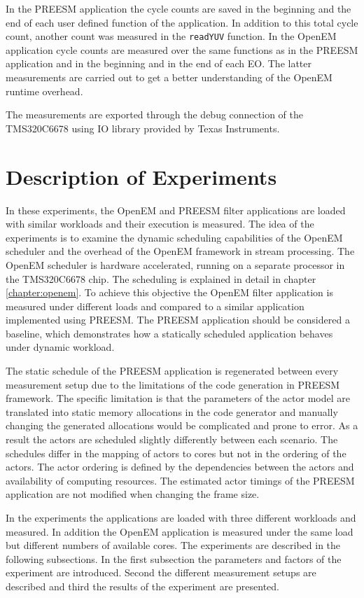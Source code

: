 In the PREESM application the cycle counts are saved in the beginning and the end of each user defined function of the application. In addition to this total cycle count, another count was measured in the \texttt{readYUV} function. In the OpenEM application cycle counts are measured over the same functions as in the PREESM application and in the beginning and in the end of each EO. The latter measurements are carried out to get a better understanding of the OpenEM runtime overhead.

The measurements are exported through the debug connection of the TMS320C6678 using IO library provided by Texas Instruments.

\section{Description of Experiments}
\label{sec:experiment-description}
In these experiments, the OpenEM and PREESM filter applications are loaded with similar workloads and their execution is measured. The idea of the experiments is to examine the dynamic scheduling capabilities of the OpenEM scheduler and the overhead of the OpenEM framework in stream processing. The OpenEM scheduler is hardware accelerated, running on a separate processor in the TMS320C6678 chip. The scheduling is explained in detail in chapter \ref{chapter:openem}. To achieve this objective the OpenEM filter application is measured under different loads and compared to a similar application implemented using PREESM. The PREESM application should be considered a baseline, which demonstrates how a statically scheduled application behaves under dynamic workload.

The static schedule of the PREESM application is regenerated between every measurement setup due to the limitations of the code generation in PREESM framework. The specific limitation is that the parameters of the actor model are translated into static memory allocations in the code generator and manually changing the generated allocations would be complicated and prone to error. As a result the actors are scheduled slightly differently between each scenario. The schedules differ in the mapping of actors to cores but not in the ordering of the actors. The actor ordering is defined by the dependencies between the actors and availability of computing resources. The estimated actor timings of the PREESM application are not modified when changing the frame size.

In the experiments the applications are loaded with three different workloads and measured. In addition the OpenEM application is measured under the same load but different numbers of available cores. The experiments are described in the following subsections. In the first subsection the parameters and factors of the experiment are introduced. Second the different measurement setups are described and third the results of the experiment are presented.

